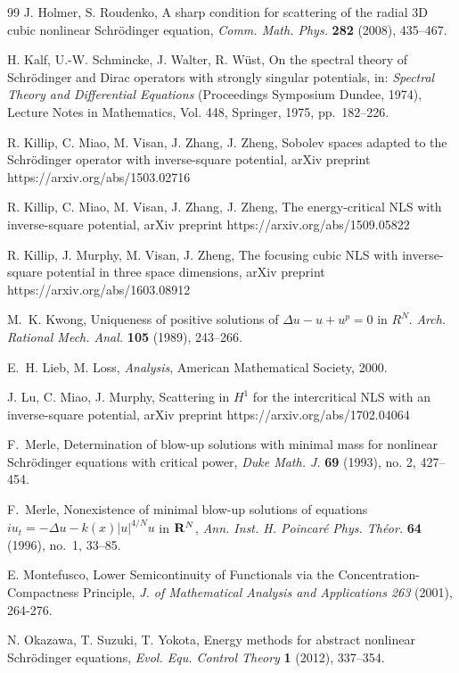 \documentclass[reqno]{amsart}
\theoremstyle{plain}
\theoremstyle{definition}
\numberwithin{equation}{section}
\begin{document}
\begin{thebibliography}{99}
J. Holmer, S. Roudenko, 
A sharp condition for scattering of the radial 3D cubic nonlinear 
Schr\"odinger equation,
{\it Comm. Math. Phys.} {\bf 282} (2008), 435--467. 

H. Kalf, U.-W. Schmincke, J. Walter, R. W\"ust, 
On the spectral theory of Schr\"odinger and Dirac
operators with strongly singular potentials, in: {\it Spectral Theory and Differential Equations}
(Proceedings Symposium Dundee, 1974), 
Lecture Notes in Mathematics, Vol. 448, Springer, 1975, pp.~182--226.


R. Killip, C. Miao, M. Visan, J. Zhang, J. Zheng,
Sobolev spaces adapted to the Schr\"odinger operator with inverse-square potential,
arXiv preprint https://arxiv.org/abs/1503.02716

R. Killip, C. Miao, M. Visan, J. Zhang, J. Zheng,
The energy-critical NLS with inverse-square potential,
arXiv preprint https://arxiv.org/abs/1509.05822

R. Killip, J. Murphy, M. Visan, J. Zheng,
The focusing cubic NLS with inverse-square potential in three space dimensions,
arXiv preprint https://arxiv.org/abs/1603.08912

M.~K. Kwong,
Uniqueness of positive solutions of $\Delta u - u +u^p =0$ in $R^N$. 
{\it Arch. Rational Mech. Anal.} {\bf 105} (1989), 243--266.

E.~H. Lieb, M. Loss,
{\it Analysis}, American Mathematical Society, 2000.

J. Lu, C. Miao, J. Murphy,
Scattering in $H^1$ for the intercritical NLS with an inverse-square potential,
arXiv preprint https://arxiv.org/abs/1702.04064

 F.~Merle,
Determination of blow-up solutions with minimal mass for nonlinear Schr\"odinger equations with critical
power, {\it Duke Math. J.} {\bf 69} (1993), no. 2, 427--454.

 F.~Merle, Nonexistence of minimal blow-up solutions of equations
$iu_t=-\Delta u-k(x)\vert u\vert ^{4/N}u$ in ${\bf R}^N$,
{\it Ann. Inst. H. Poincar\'e Phys. Th\'eor.} {\bf 64} (1996), no.~1, 33--85.

E. Montefusco,
Lower Semicontinuity of Functionals via the Concentration-Compactness Principle,
{\it J. of Mathematical Analysis and Applications 263} (2001), 264-276.

 N. Okazawa, T. Suzuki, T. Yokota,
Energy methods for abstract nonlinear Schr{\"o}dinger equations,
{\it Evol. Equ. Control Theory} {\bf 1} (2012), 337--354.


\end{thebibliography}
\end{document}
